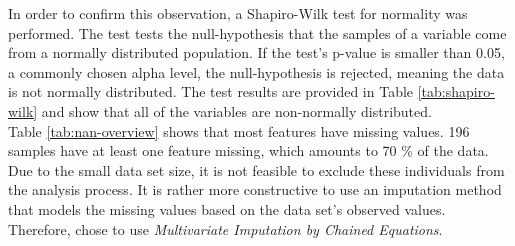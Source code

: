 In order to confirm this observation, a Shapiro-Wilk test for normality was 
performed.
The test tests the null-hypothesis that the samples of a variable come from a 
normally distributed population. If the test's p-value is smaller than 
0.05, a commonly chosen alpha level, the null-hypothesis is rejected, 
meaning the data is not normally distributed.
The test results are provided in Table \ref{tab:shapiro-wilk} and show 
that all of the variables are non-normally distributed.
\\
Table \ref{tab:nan-overview} shows that most features have missing values. 196 
samples have at least one feature missing, which amounts to 70 \% of the data. 
Due to the small data set size, it is not feasible to exclude these 
individuals from the analysis process. It is rather more constructive to use an 
imputation method that models the missing values based on the data set's 
observed values. Therefore, \citeauthor{RN127} chose to use 
\textit{Multivariate 
Imputation by Chained Equations}. 
